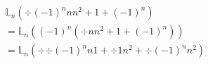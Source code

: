 \subsection{}
    \begin{align*}
        & 𝕃_{n}(÷{(-1)^{n}n}{n^{2}+1+(-1)^{n}}) \\
        &= 𝕃_{n}((-1)^{n}(÷{n}{n^{2}+1+(-1)^{n}})) \\
        &= 𝕃_{n}(÷{÷{(-1)^{n}}{n}}{1+÷{1}{n^{2}}+÷{(-1)^{n}}{n^{2}}})
    \end{align*}